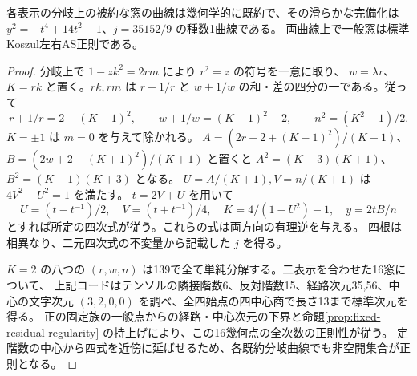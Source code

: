\begin{proposition}\label{prop:rank-fifteen-ramification-curve}
各表示の分岐上の被約な窓の曲線は幾何学的に既約で、その滑らかな完備化は
$y^2=-t^4+14t^2-1$、$j=35152/9$ の種数1曲線である。
両曲線上で一般窓は標準Koszul左右AS正則である。
\end{proposition}
\begin{proof}
分岐上で $1-zk^2=2rm$ により $r^2=z$ の符号を一意に取り、
$w=\lambda r$、$K=rk$ と置く。$rk,rm$ は
$r+1/r$ と $w+1/w$ の和・差の四分の一である。従って
\[
 r+1/r=2-(K-1)^2,\qquad
 w+1/w=(K+1)^2-2,\qquad n^2=(K^2-1)/2.
\]
$K=\pm1$ は $m=0$ を与えて除かれる。
$A=(2r-2+(K-1)^2)/(K-1)$、$B=(2w+2-(K+1)^2)/(K+1)$ と置くと
$A^2=(K-3)(K+1)$、$B^2=(K-1)(K+3)$ となる。
$U=A/(K+1),V=n/(K+1)$ は $4V^2-U^2=1$ を満たす。
$t=2V+U$ を用いて
\[
 U=(t-t^{-1})/2,\quad V=(t+t^{-1})/4,\quad
 K=4/(1-U^2)-1,\quad y=2tB/n
\]
とすれば所定の四次式が従う。これらの式は両方向の有理逆を与える。
四根は相異なり、二元四次式の不変量から記載した $j$ を得る。

$K=2$ の八つの $(r,w,n)$ は139で全て単純分解する。二表示を合わせた16窓について、
上記コードはテンソルの隣接階数6、反対階数15、経路次元35,56、中心の文字次元
$(3,2,0,0)$ を調べ、全四始点の四中心商で長さ13まで標準次元を得る。
正の固定族の一般点からの経路・中心次元の下界と命題\ref{prop:fixed-residual-regularity}
の持上げにより、この16幾何点の全次数の正則性が従う。
定階数の中心から四式を近傍に延ばせるため、各既約分岐曲線でも非空開集合が正則となる。
\end{proof}

